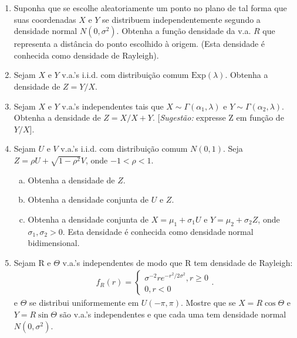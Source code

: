 \documentclass[../Notas.tex]{subfiles}
\begin{document}
\begin{enumerate}
    \item Suponha que se escolhe aleatoriamente um ponto no plano de tal forma que suas coordenadas $X$ e $Y$ se distribuem independentemente segundo a densidade normal $N(0, \sigma^2)$. Obtenha a função densidade da v.a. $R$ que representa a distância do ponto escolhido à origem. (Esta densidade é conhecida como densidade de Rayleigh).
    \item Sejam $X$ e $Y$ v.a.’s i.i.d. com distribuição comum $\text{Exp}(\lambda)$. Obtenha a densidade de $Z = Y/X$.
    \item Sejam $X$ e $Y$ v.a.’s independentes tais que $X\sim\Gamma(\alpha_1, \lambda)$ e $Y\sim\Gamma(\alpha_2,\lambda)$. Obtenha a densidade de $Z = X/X+Y$. [\textit{Sugestão:} expresse Z em função de $Y/X$].
    \item Sejam $U$ e $V$ v.a.’s i.i.d. com distribuição comum $N(0,1)$. Seja $Z = \rho U + \sqrt{1-\rho^2} V$, onde $-1 < \rho < 1$.
    \begin{enumerate}[a)]
    \item Obtenha a densidade de $Z$.
    \item Obtenha a densidade conjunta de $U$ e $Z$.
    \item Obtenha a densidade conjunta de $X = \mu_1 + \sigma_1 U$ e $Y = \mu_2 + \sigma_2 Z$, onde $\sigma_1, \sigma_2 > 0$. Esta densidade é conhecida como densidade normal bidimensional.
    \end{enumerate}
    \item Sejam R e $\Theta$ v.a.’s independentes de modo que R tem densidade de Rayleigh:
    \begin{align*}
        f_R(r) = \begin{cases}
            \sigma^{-2}re^{-r^2/2\sigma^2}, r\geq 0 \\
            0, r < 0
        \end{cases}.
    \end{align*}
e $\Theta$ se distribui uniformemente em $U(-\pi, \pi)$. Mostre que se $X = R\cos\Theta$ e $Y = R\sin\Theta$ são v.a.’s independentes e que cada uma tem densidade normal $N(0, \sigma^2)$.
\end{enumerate}
\end{document}
